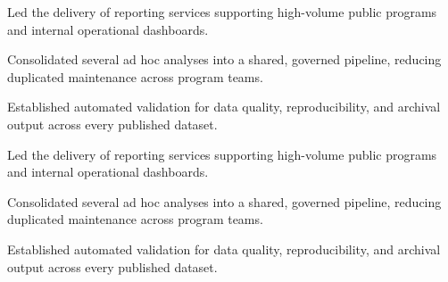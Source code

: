 \documentclass[fontsize=11pt, margin=narrow, medium=print]{careerdossier-cv}
\begin{document}
\begin{CDossierEntry}[title = {Analytics Engineer}, organization = {Regional Data Cooperative}, location = {Kitchener, ON}, dates = {2016--2018}]
  \begin{CDossierItemize}
    \item Led the delivery of reporting services supporting high-volume public programs and internal operational dashboards.
    \item Consolidated several ad hoc analyses into a shared, governed pipeline, reducing duplicated maintenance across program teams.
    \item Established automated validation for data quality, reproducibility, and archival output across every published dataset.
  \end{CDossierItemize}
\end{CDossierEntry}
\begin{CDossierEntry}[title = {Junior Analyst}, organization = {Lakeshore Analytics Group}, location = {Hamilton, ON}, dates = {2014--2016}]
  \begin{CDossierItemize}
    \item Led the delivery of reporting services supporting high-volume public programs and internal operational dashboards.
    \item Consolidated several ad hoc analyses into a shared, governed pipeline, reducing duplicated maintenance across program teams.
    \item Established automated validation for data quality, reproducibility, and archival output across every published dataset.
  \end{CDossierItemize}
\end{CDossierEntry}

\begin{CDossierEntry}[title = {Ph.D. in Computer Science}, organization = {University of Toronto}, location = {Toronto, ON}, dates = {2021--2026}]
\end{CDossierEntry}
\begin{CDossierEntry}[title = {M.Sc. in Software Engineering}, organization = {McGill University}, location = {Montréal, QC}, dates = {2019--2021}]
\end{CDossierEntry}
\begin{CDossierEntry}[title = {B.A.Sc. in Computer Engineering, Honours}, organization = {University of Waterloo}, location = {Waterloo, ON}, dates = {2014--2019}]
\end{CDossierEntry}
\end{document}
